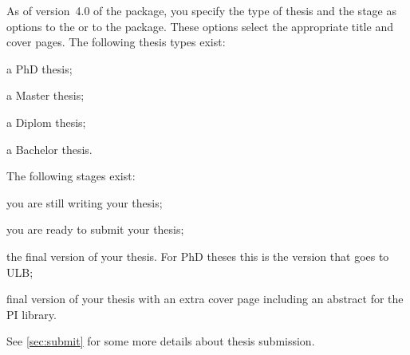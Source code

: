 As of version~4.0 of the package, you specify the type of thesis and the stage as options
to the  or to the  package.
These options select the appropriate title and cover pages.
The following thesis types exist:
\begin{description}\setlength{\parskip}{0pt}\setlength{\itemsep}{0pt}
\item[PhD] a PhD thesis;
\item[Master] a Master thesis;
\item[Diplom] a Diplom thesis;
\item[Bachelor] a Bachelor thesis.
\end{description}
The following stages exist:
\begin{description}\setlength{\parskip}{0pt}\setlength{\itemsep}{0pt}
\item[Draft] you are still writing your thesis;
\item[Submit] you are ready to submit your thesis;
\item[Final] the final version of your thesis.
  For PhD theses this is the version that goes to ULB;
\item[PILibrary] final version of your thesis with an extra cover page
  including an abstract for the PI library.
\end{description}
%
See \cref{sec:submit} for some more details about thesis submission.

